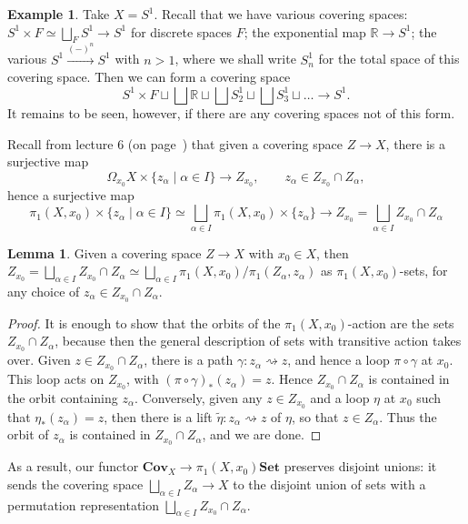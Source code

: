 \documentclass{tufte-handout}
\def\Set {\mathbf{Set}}
\def\Cov {\mathbf{Cov}}
\def\RR{\mathbb{R}}
\theoremstyle{definition}
\newtheorem{lemma}{Lemma}
\newtheorem{example}{Example}
\begin{document}
\begin{example}
Take $X=S^1$. Recall that we have various covering spaces: $S^1\times F\simeq \bigsqcup_{F} S^1\to S^1$ for discrete spaces $F$; the exponential map $\RR \to S^1$; the various $S^1 \xrightarrow{(-)^n} S^1$ with $n>1$, where we shall write $S^1_n$ for the total space of this covering space. Then we can form a covering space
\[
	S^1\times F \sqcup \bigsqcup \RR \sqcup \bigsqcup S^1_2 \sqcup \bigsqcup S^1_3\sqcup \ldots \to S^1.
\]
It remains to be seen, however, if there are any covering spaces not of this form.
\end{example}

Recall from lecture 6 (on page~\pageref{eq:fibre_quotient_of_loops}) that given a covering space $Z\to X$, there is a surjective map
\[
	\Omega_{x_0} X \times\{z_\alpha\mid \alpha \in I\} \to Z_{x_0}, \qquad z_\alpha \in Z_{x_0}\cap Z_\alpha,
\]
hence a surjective map \[
	\pi_1(X,x_0) \times \{z_\alpha\mid \alpha \in I\} \simeq \bigsqcup_{\alpha\in I}\pi_1(X,x_0) \times  \{z_\alpha\} \to Z_{x_0} = \bigsqcup_{\alpha\in I} Z_{x_0}\cap Z_\alpha
\]
\begin{lemma}
Given a covering space $Z\to X$ with $x_0\in X$, then $Z_{x_0} =\bigsqcup_{\alpha\in I} Z_{x_0}\cap Z_\alpha\simeq \bigsqcup_{\alpha\in I} \pi_1(X,x_0)/\pi_1(Z_\alpha,z_\alpha)$ as $\pi_1(X,x_0)$-sets, for any choice of $z_\alpha\in Z_{x_0}\cap Z_\alpha$.
\end{lemma}

\begin{proof}
It is enough to show that the orbits of the $\pi_1(X,x_0)$-action are the sets $Z_{x_0}\cap Z_\alpha$, because then the general description of sets with transitive action takes over. Given $z\in Z_{x_0}\cap Z_\alpha$, there is a path $\gamma\colon z_\alpha \rightsquigarrow z$, and hence a loop $\pi\circ\gamma$ at $x_0$. This loop acts on $Z_{x_0}$, with $(\pi\circ \gamma)_*(z_\alpha)=z$. Hence $Z_{x_0}\cap Z_\alpha$ is contained in the orbit containing $z_\alpha$. Conversely, given any $z\in Z_{x_0}$ and a loop $\eta$ at $x_0$ such that $\eta_*(z_\alpha) = z$, then there is a lift $\widetilde{\eta}\colon z_\alpha \rightsquigarrow z$ of $\eta$, so that $z\in Z_\alpha$. Thus the orbit of $z_\alpha$ is contained in $Z_{x_0}\cap Z_\alpha$, and we are done.
\end{proof}

As a result, our functor $\Cov_X \to \pi_1(X,x_0)\Set$ preserves disjoint unions: it sends the covering space $\bigsqcup_{\alpha \in I} Z_\alpha\to X$ to the disjoint union of sets with a permutation representation $\bigsqcup_{\alpha\in I} Z_{x_0}\cap Z_\alpha$.
\end{document}
